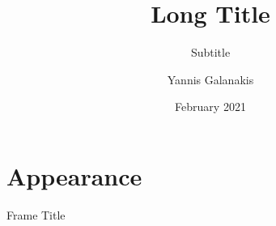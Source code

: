 \documentclass[compress,aspectratio=169, table]{beamer}
\title[ShortTitle]{Long Title}
\subtitle{Subtitle}
\author{Yannis Galanakis}
\institute{University of Kent}
\date{February 2021}
\begin{document}
	
	\begin{frame}
		\maketitle
	\end{frame}
	
	
	\section{Appearance}


\begin{frame}{Frame Title}
\end{frame}
\end{document}
